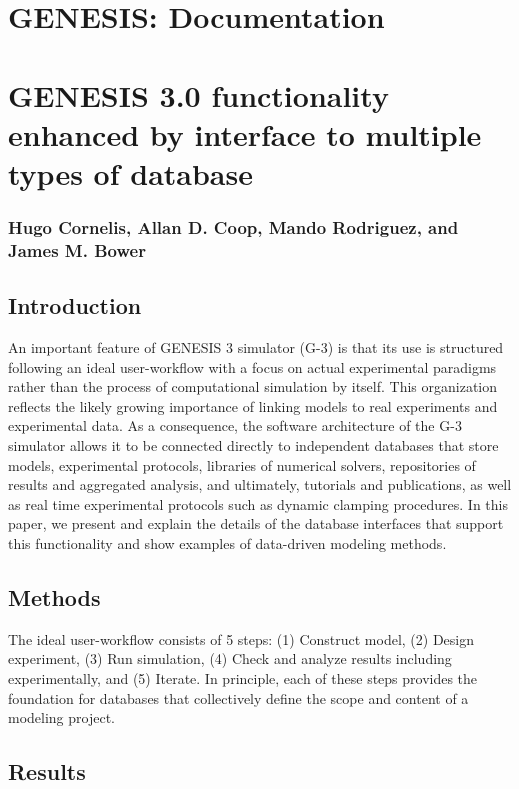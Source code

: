 \documentclass[12pt]{article}
\begin{document}
\section*{GENESIS: Documentation}

\section*{GENESIS 3.0 functionality enhanced by interface to multiple types of database}

\subsubsection*{Hugo Cornelis, Allan D. Coop, Mando Rodriguez, and James M. Bower}

\subsection*{Introduction}

An important feature of GENESIS 3 simulator (G-3) is that its use is
structured following an ideal user-workflow with a focus on actual
experimental paradigms rather than the process of computational
simulation by itself.  This organization reflects the likely growing
importance of linking models to real experiments and experimental
data.  As a consequence, the software architecture of the G-3
simulator allows it to be connected directly to independent databases
that store models, experimental protocols, libraries of numerical
solvers, repositories of results and aggregated analysis, and
ultimately, tutorials and publications, as well as real time
experimental protocols such as dynamic clamping procedures.  In this
paper, we present and explain the details of the database interfaces
that support this functionality and show examples of data-driven
modeling methods.


\subsection*{Methods}

The ideal user-workflow consists of 5 steps: (1) Construct model, (2)
Design experiment, (3) Run simulation, (4) Check and analyze results
including experimentally, and (5) Iterate. In principle, each of these
steps provides the foundation for databases that collectively define
the scope and content of a modeling project.

\subsection*{Results}
\end{document}
